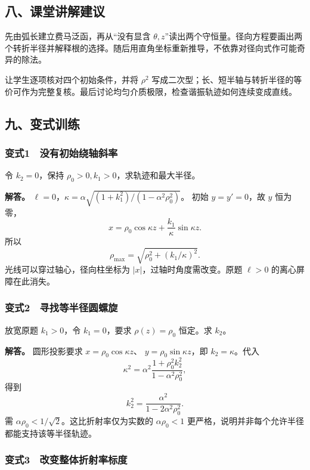 \documentclass[12pt,a4paper,fontset=fandol]{ctexart}
\begin{document}
\subsection{八、课堂讲解建议}\label{ux516bux8bfeux5802ux8bb2ux89e3ux5efaux8bae-6}

先由弧长建立费马泛函，再从``没有显含
\(\theta,z\)''读出两个守恒量。径向方程要画出两个转折半径并解释根的选择。随后用直角坐标重新推导，不依靠对径向式作可能奇异的除法。

让学生逐项核对四个初始条件，并将 \(\rho^2\)
写成二次型；长、短半轴与转折半径的等价可作为完整复核。最后讨论均匀介质极限，检查谐振轨迹如何连续变成直线。

\subsection{九、变式训练}\label{ux4e5dux53d8ux5f0fux8badux7ec3-6}

\subsubsection{变式1　没有初始绕轴斜率}\label{ux53d8ux5f0f1-ux6ca1ux6709ux521dux59cbux7ed5ux8f74ux659cux7387}

令 \(k_2=0\)，保持 \(\rho_0>0,k_1>0\)，求轨迹和最大半径。

\textbf{解答。}
\(\ell=0\)，\(\kappa=\alpha\sqrt{(1+k_1^2)/(1-\alpha^2\rho_0^2)}\)。
初始 \(y=y'=0\)，故 \(y\) 恒为零， \[
x=\rho_0\cos\kappa z+\frac{k_1}{\kappa}\sin\kappa z.
\] 所以 \[
\boxed{\rho_{\max}=\sqrt{\rho_0^2+(k_1/\kappa)^2}.}
\] 光线可以穿过轴心，径向柱坐标为 \(|x|\)，过轴时角度需改变。原题
\(\ell>0\) 的离心屏障在此消失。

\subsubsection{变式2　寻找等半径圆螺旋}\label{ux53d8ux5f0f2-ux5bfbux627eux7b49ux534aux5f84ux5706ux87baux65cb}

放宽原题 \(k_1>0\)，令 \(k_1=0\)，要求 \(\rho(z)=\rho_0\) 恒定。求
\(k_2\)。

\textbf{解答。} 圆形投影要求 \(x=\rho_0\cos\kappa z\)、
\(y=\rho_0\sin\kappa z\)，即 \(k_2=\kappa\)。代入 \[
\kappa^2=\alpha^2\frac{1+\rho_0^2k_2^2}
{1-\alpha^2\rho_0^2},
\] 得到 \[
\boxed{k_2^2=\frac{\alpha^2}{1-2\alpha^2\rho_0^2}.}
\] 需 \(\alpha\rho_0<1/\sqrt2\)。这比折射率仅为实数的 \(\alpha\rho_0<1\)
更严格，说明并非每个允许半径都能支持该等半径轨迹。

\subsubsection{变式3　改变整体折射率标度}\label{ux53d8ux5f0f3-ux6539ux53d8ux6574ux4f53ux6298ux5c04ux7387ux6807ux5ea6}
\end{document}
